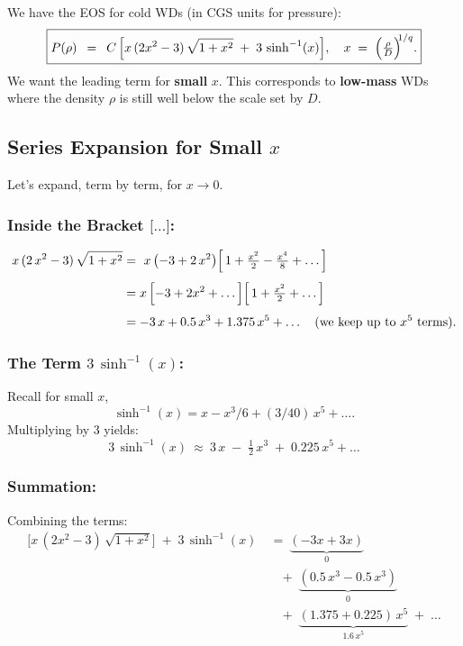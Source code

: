 \documentclass[12pt]{article}
\begin{document}
We have the EOS for cold WDs (in CGS units for pressure):
\[
\boxed{
P(\rho)
~\,=\,~
C\,\Bigl[x\,(2x^{2}-3)\,\sqrt{1 + x^{2}} \;+\; 3\,\sinh^{-1}(x)\Bigr],
\quad
x \;=\;\Bigl(\tfrac{\rho}{D}\Bigr)^{\!\!1/q}.
}
\]
We want the leading term for \textbf{small} \(x\). This corresponds to \textbf{low-mass} WDs where the density \(\rho\) is still well below the scale set by \(D\).

\subsection{Series Expansion for Small \(x\)}

Let’s expand, term by term, for \(x \to 0\).

\subsubsection{Inside the Bracket \(\bigl[\ldots\bigr]\):}

\[
\begin{aligned}
x\,(2\,x^2 - 3)\,\sqrt{1 + x^2}
&=~
x\,\bigl(-3 + 2\,x^2\bigr)
\Bigl[\,1 + \tfrac{x^2}{2} - \tfrac{x^4}{8} + \dots\Bigr] 
\\[4pt]
&=
x\,\Bigl[-3 + 2x^2 + \dots\Bigr]
\Bigl[\,1 + \tfrac{x^2}{2} + \dots\Bigr]
\\[4pt]
&=
-3\,x + 0.5\,x^3 + 1.375\,x^5 + \dots
\quad(\text{we keep up to }x^5\text{ terms}).
\end{aligned}
\]

\subsubsection{The Term \(3\,\sinh^{-1}(x)\):}

Recall for small \(x\),
\[
\sinh^{-1}(x) = x - x^3/6 + (3/40)\,x^5 + \dots.
\]
Multiplying by 3 yields:
\[
3\,\sinh^{-1}(x)
~\approx~
3\,x \;-\;\tfrac{1}{2}\,x^3 \;+\; 0.225\,x^5 + \dots
\]

\subsubsection{Summation:}

Combining the terms:
\[
\begin{aligned}
\bigl[x\,(2x^2-3)\,\sqrt{1+x^2}\bigr] 
\;+\; 3\,\sinh^{-1}(x)
&~=~
\underbrace{(-3x + 3x)}_{0}
\\[6pt]
&\quad+\; \underbrace{(0.5\,x^3 - 0.5\,x^3)}_{0}
\\[6pt]
&\quad+\; \underbrace{(1.375 + 0.225)\,x^5}_{1.6\,x^5}
\;+\;\dots
\end{aligned}
\]
\end{document}
